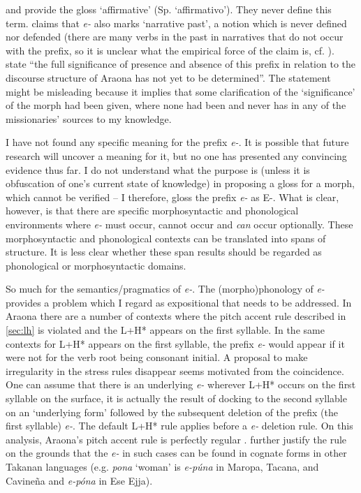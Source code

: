 \documentclass[output=paper,hidelinks]{langscibook}
\begin{document}
\citet{pitmanpitman1976} and \citet{pitman:1980:araonasketch} provide the gloss `affirmative' (Sp. `affirmativo'). They never define this term. \citet{pitman:1980:araonasketch} claims that \textit{e-} also marks `narrative past', a notion which is never defined nor defended (there are many verbs in the past in narratives that do not occur with the prefix, so it is unclear what the empirical force of the claim is, cf. \citealt{tallmanaraonadocumentation:2021}). \citet[16]{pitmanpitman1976} state ``the full significance of presence and absence of this prefix in relation to the discourse structure of Araona has not yet to be determined''. The statement might be misleading because it implies that some clarification of the `significance' of the morph had been given, where none had been and never has in any of the missionaries' sources to my knowledge.

I have not found any specific meaning for the prefix \textit{e-}. It is possible that future research will uncover a meaning for it, but no one has presented any convincing evidence thus far. I do not understand what the purpose is (unless it is obfuscation of one's current state of knowledge) in proposing a gloss for a morph, which cannot be verified -- I therefore, gloss the prefix \textit{e-} as \textsc{E-}. What is clear, however, is that there are specific morphosyntactic and phonological environments where \textit{e-} must occur, cannot occur and \textit{can} occur optionally. These morphosyntactic and phonological contexts can be translated into spans of structure. It is less clear whether these span results should be regarded as phonological or morphosyntactic domains. 

So much for the semantics/pragmatics of \textit{e-}. The (morpho)phonology of \textit{e-} provides a problem which I regard as expositional that needs to be addressed. In Araona there are a number of contexts where the pitch accent rule described in \ref{sec:lh} is violated and the L+H* appears on the first syllable. In the same contexts for L+H* appears on the first syllable, the prefix \textit{e-} would appear if it were not for the verb root being consonant initial. A proposal to make irregularity in the stress rules disappear seems motivated from the coincidence. One can assume that there is an underlying \textit{e-} wherever L+H* occurs on the first syllable on the surface, it is actually the result of docking to the second syllable on an `underlying form' followed by the subsequent deletion of the prefix (the first syllable) \textit{e-}. The default L+H* rule applies before a \textit{e-} deletion rule. On this analysis, Araona's pitch accent rule is perfectly regular \citep{pitmanpitman1976}. \citet{pitmanpitman1976} further justify the rule on the grounds that the \textit{e-} in such cases can be found in cognate forms in other Takanan languages (e.g. \textit{pona} `woman' is \textit{e-púna} in Maropa, Tacana, and Cavineña and \textit{e-póna} in Ese Ejja).
\end{document}
